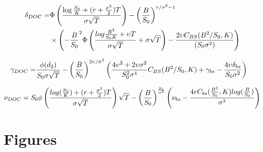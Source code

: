\documentclass[11pt,a4paper,fleqn]{article}
\begin{document}
\begin{align*}
\delta_{DOC} =& \Phi\left({\log{S_0 \over K} + (r + {\sigma^2 \over 2})T \over \sigma\sqrt{T}}\right)- \left({B\over S_0}\right)^{r /\sigma^2 - 1}\\
&\times \left(-{B\over S_0}^2 \Phi\left({log{B^2 \over S_0K} + \upsilon T \over \sigma \sqrt{T}} + \sigma \sqrt{T}\right) - {2 \upsilon C_{BS}(B^2 / S_0, K) \over (S_0\sigma^2)}\right)
\end{align*}

\begin{align*}
\gamma_{DOC} =& {\phi(d_2) \over S_0\sigma\sqrt{T}}- \left({B \over S_0}\right)^{ 2\upsilon / \sigma^2}\left({4\upsilon^2 +2\upsilon \sigma^2\over S_0^2\sigma^4}C_{BS}(B^2 / S_0, K) + \gamma_{bs} - {4\upsilon\delta_{bs} \over S_0\sigma^2}\right)
\end{align*}

\begin{align*}
\nu_{DOC} = S_0\phi\left(\frac{log({S_0 \over K}) + (r + {\sigma^2 \over 2})T}{\sigma\sqrt{T}}\right)\sqrt{T}-\left({B \over S_0}\right)^{2\upsilon \over \sigma^2}\left(\nu_{bs} - {4rC_{bs}({B^2\over S_0}, K)log({B\over S_0}) \over \sigma^3}\right)
\end{align*}



\newpage
\section{Figures}
\end{document}
